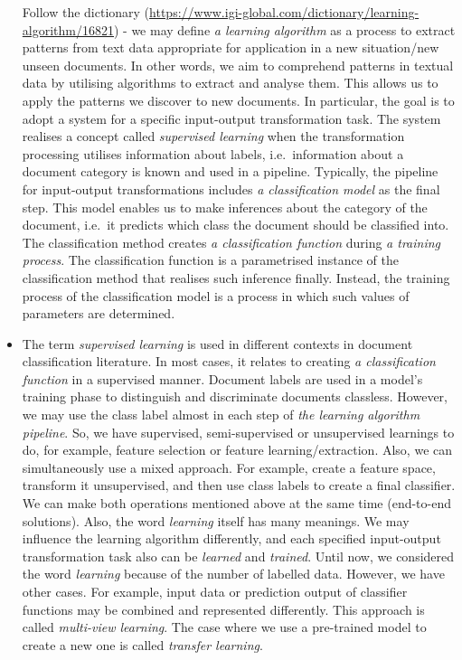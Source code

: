 \documentclass[
]{article}
\begin{document}
\begin{itemize}
  Follow the dictionary (\url{https://www.igi-global.com/dictionary/learning-algorithm/16821}) - we may define \emph{a learning algorithm} as a process to extract patterns from text data appropriate for application in a new situation/new unseen documents. In other words, we aim to comprehend patterns in textual data by utilising algorithms to extract and analyse them. This allows us to apply the patterns we discover to new documents. In particular, the goal is to adopt a system for a specific input-output transformation task. The system realises a concept called \emph{supervised learning} when the transformation processing utilises information about labels, i.e.~information about a document category is known and used in a pipeline. Typically, the pipeline for input-output transformations includes \emph{a classification model} as the final step. This model enables us to make inferences about the category of the document, i.e.~it predicts which class the document should be classified into. The classification method creates \emph{a classification function} during \emph{a training process}. The classification function is a parametrised instance of the classification method that realises such inference finally. Instead, the training process of the classification model is a process in which such values of parameters are determined.
\item
  The term \emph{supervised learning} is used in different contexts in document classification literature. In most cases, it relates to creating \emph{a classification function} in a supervised manner. Document labels are used in a model's training phase to distinguish and discriminate documents classless. However, we may use the class label almost in each step of \emph{the learning algorithm pipeline}. So, we have supervised, semi-supervised or unsupervised learnings to do, for example, feature selection or feature learning/extraction. Also, we can simultaneously use a mixed approach. For example, create a feature space, transform it unsupervised, and then use class labels to create a final classifier. We can make both operations mentioned above at the same time (end-to-end solutions). Also, the word \emph{learning} itself has many meanings. We may influence the learning algorithm differently, and each specified input-output transformation task also can be \emph{learned} and \emph{trained}. Until now, we considered the word \emph{learning} because of the number of labelled data. However, we have other cases. For example, input data or prediction output of classifier functions may be combined and represented differently. This approach is called \emph{multi-view learning}. The case where we use a pre-trained model to create a new one is called \emph{transfer learning}.

\end{itemize}
\end{document}
